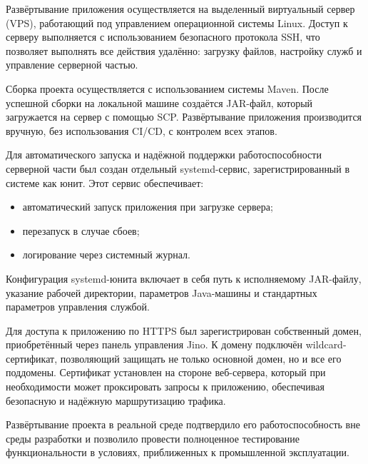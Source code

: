 Развёртывание приложения осуществляется на выделенный виртуальный сервер (VPS), работающий под управлением операционной системы Linux. Доступ к серверу выполняется с использованием безопасного протокола SSH, что позволяет выполнять все действия удалённо: загрузку файлов, настройку служб и управление серверной частью.

Сборка проекта осуществляется с использованием системы Maven. После успешной сборки на локальной машине создаётся JAR-файл, который загружается на сервер с помощью SCP. Развёртывание приложения производится вручную, без использования CI/CD, с контролем всех этапов.

Для автоматического запуска и надёжной поддержки работоспособности серверной части был создан отдельный systemd-сервис, зарегистрированный в системе как юнит. Этот сервис обеспечивает:
\begin{itemize}
    \item автоматический запуск приложения при загрузке сервера;
    \item перезапуск в случае сбоев;
    \item логирование через системный журнал.
\end{itemize}

Конфигурация systemd-юнита включает в себя путь к исполняемому JAR-файлу, указание рабочей директории, параметров Java-машины и стандартных параметров управления службой.

Для доступа к приложению по HTTPS был зарегистрирован собственный домен, приобретённый через панель управления Jino. К домену подключён wildcard-сертификат, позволяющий защищать не только основной домен, но и все его поддомены. Сертификат установлен на стороне веб-сервера, который при необходимости может проксировать запросы к приложению, обеспечивая безопасную и надёжную маршрутизацию трафика.



Развёртывание проекта в реальной среде подтвердило его работоспособность вне среды разработки и позволило провести полноценное тестирование функциональности в условиях, приближенных к промышленной эксплуатации.


